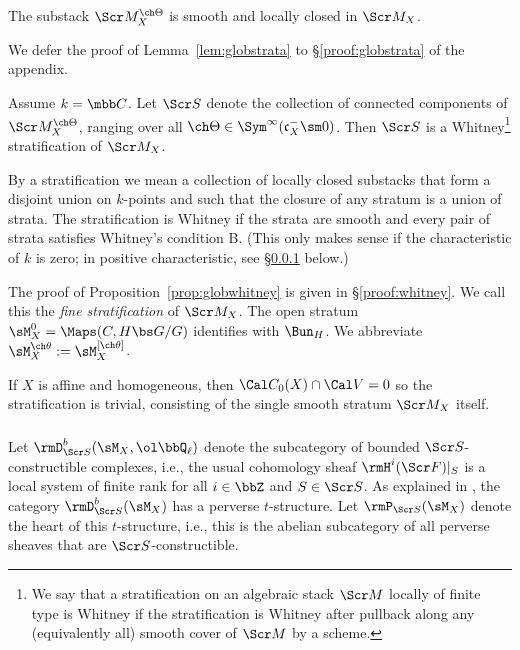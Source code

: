 \begin{lem}
\notready \label{lem:globstrata}
The substack $\Scr M^{\ch\Theta}_X$ is
smooth and locally closed in $\Scr M_X$.
\end{lem}

We defer the proof of Lemma~\ref{lem:globstrata} to \S\ref{proof:globstrata} of the appendix.


\begin{prop}
\notready \label{prop:globwhitney}
Assume $k=\mbb C$. Let $\Scr S$ denote the collection of connected components of
$\Scr M^{\ch\Theta}_X$, ranging over all
$\ch\Theta \in \Sym^\infty(\mathfrak c_X^- \sm 0)$. Then $\Scr S$
is a Whitney\footnote{We say that a stratification on an algebraic stack $\Scr M$ locally of
finite type is Whitney if the stratification is Whitney after pullback
along any (equivalently all) smooth cover of $\Scr M$ by a scheme.}
stratification of $\Scr M_X$.
\end{prop}

By a stratification we mean a collection of locally closed substacks that form a
disjoint union on $k$-points and such that the closure of any stratum is a union of
strata. The stratification is Whitney if the strata are smooth and
every pair of strata satisfies Whitney's condition B. (This only makes sense
if the characteristic of $k$ is zero; in positive characteristic, see
\S \ref{sect:whitneyperverse} below.)



The proof of Proposition~\ref{prop:globwhitney} is given in \S\ref{proof:whitney}.
We call this the \emph{fine stratification} of $\Scr M_X$.
The open stratum $\sM_X^0 = \Maps(C, H\bs G/G)$ identifies
with $\Bun_H$. We abbreviate $\sM_X^{\ch\theta} := \sM_X^{[\ch\theta]}$.

\begin{rem}
\notready
If $X$ is affine and homogeneous, then $\Cal C_0(X) \cap \Cal V = 0$
so the stratification is trivial, consisting of
the single smooth stratum $\Scr M_X$ itself.
\end{rem}

\subsubsection{} \label{sect:whitneyperverse}
Let $\rmD^b_{\Scr S}(\sM_X,\ol\bbQ_\ell)$
denote the subcategory of bounded $\Scr S$-constructible complexes, i.e.,
the usual cohomology sheaf $\rmH^i(\Scr F)|_S$ is a local system
of finite rank for all $i\in\bbZ$ and $S\in\Scr S$.
As explained in \cite{BBDG}, the category $\rmD^b_{\Scr S}(\sM_X)$ has a
perverse $t$-structure. Let $\rmP_{\Scr S}(\sM_X)$ denote the heart
of this $t$-structure, i.e., this is the abelian subcategory of all perverse sheaves
that are $\Scr S$-constructible.

